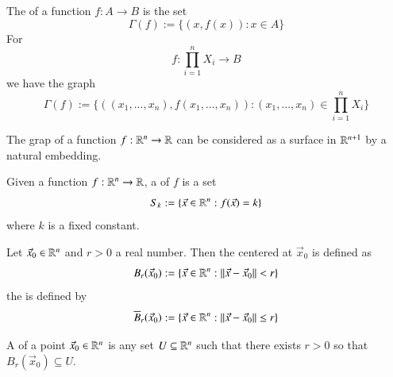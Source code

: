 \documentclass[12pt, a4paper, oneside, openright, titlepage]{book}
\begin{document}
\begin{appendices}
    
    \begin{defn}
        The  of a function $f:A\rightarrow B$ is the set \begin{equation}
            \Gamma(f):=\{(x,f(x)):x \in A\}
        \end{equation}
        For \begin{equation}
            f:\prod\limits_{i=1}^nX_i\rightarrow B
        \end{equation}
        we have the graph \begin{equation}
            \Gamma(f):= \{((x_1,...,x_n),f(x_1,...,x_n)):(x_1,...,x_n) \in \prod\limits_{i=1}^nX_i\}
        \end{equation}
    \end{defn}

    \begin{rmk}
        The grap of a function $f:\mathbb R^n\rightarrow \mathbb R$ can be considered as a surface in $\mathbb R^{n+1}$ by a natural embedding.
    \end{rmk}


    \begin{defn}
        Given a function $f:\mathbb R^n\rightarrow \mathbb R$, a  of $f$ is a set \begin{equation}
            S_k := \{\vec{x} \in \mathbb R^n: f(\vec{x}) = k\}
        \end{equation}
        where $k$ is a fixed constant.
    \end{defn}


    \begin{defn}
        Let $\vec{x}_0 \in \mathbb R^n$ and $r > 0$ a real number. Then the  centered at $\vec{x}_0$ is defined as \begin{equation}
            B_r(\vec{x}_0) := \{\vec{x} \in \mathbb R^n: ||\vec{x} - \vec{x}_0|| < r\}
        \end{equation}
        the  is defined by \begin{equation}
            \overline{B}_r(\vec{x}_0) := \{\vec{x} \in \mathbb R^n: ||\vec{x} - \vec{x}_0|| \leq r\}
        \end{equation}
    \end{defn}

    \begin{defn}
        A  of a point $\vec{x}_0 \in \mathbb R^n$ is any set $U \subseteq \mathbb R^n$ such that there exists $r > 0$ so that $B_r(\vec{x}_0) \subseteq U$.
    \end{defn}



\end{appendices}
\end{document}
